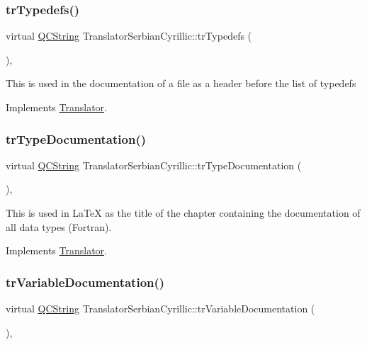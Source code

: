 \subsubsection{\texorpdfstring{trTypedefs()}{trTypedefs()}}
{\footnotesize\ttfamily virtual \mbox{\hyperlink{class_q_c_string}{Q\+C\+String}} Translator\+Serbian\+Cyrillic\+::tr\+Typedefs (\begin{DoxyParamCaption}{ }\end{DoxyParamCaption})\hspace{0.3cm}{\ttfamily [inline]}, {\ttfamily [virtual]}}

This is used in the documentation of a file as a header before the list of typedefs 

Implements \mbox{\hyperlink{class_translator}{Translator}}.

\mbox{\label{class_translator_serbian_cyrillic_ac560f2984b67ce39d50eeafa926963f1}} 
\subsubsection{\texorpdfstring{trTypeDocumentation()}{trTypeDocumentation()}}
{\footnotesize\ttfamily virtual \mbox{\hyperlink{class_q_c_string}{Q\+C\+String}} Translator\+Serbian\+Cyrillic\+::tr\+Type\+Documentation (\begin{DoxyParamCaption}{ }\end{DoxyParamCaption})\hspace{0.3cm}{\ttfamily [inline]}, {\ttfamily [virtual]}}

This is used in La\+TeX as the title of the chapter containing the documentation of all data types (Fortran). 

Implements \mbox{\hyperlink{class_translator}{Translator}}.

\mbox{\label{class_translator_serbian_cyrillic_a3efb02fc5cfd12aa212de984f3ddb59b}} 
\subsubsection{\texorpdfstring{trVariableDocumentation()}{trVariableDocumentation()}}
{\footnotesize\ttfamily virtual \mbox{\hyperlink{class_q_c_string}{Q\+C\+String}} Translator\+Serbian\+Cyrillic\+::tr\+Variable\+Documentation (\begin{DoxyParamCaption}{ }\end{DoxyParamCaption})\hspace{0.3cm}{\ttfamily [inline]}, {\ttfamily [virtual]}}

